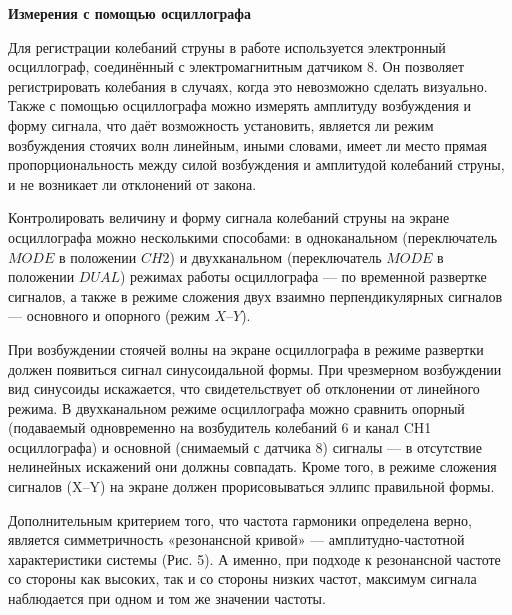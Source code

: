 \documentclass[a4paper,12pt]{article} %
\begin{document}
{\bf Измерения с помощью осциллографа}

Для регистрации колебаний струны в работе используется электронный
осциллограф, соединённый с электромагнитным датчиком 8. Он позволяет
регистрировать колебания в случаях, когда это невозможно сделать визуально. Также с помощью осциллографа можно измерять амплитуду возбуждения и форму сигнала, что даёт возможность установить, является ли режим
возбуждения стоячих волн линейным, иными словами, имеет ли место прямая пропорциональность между силой возбуждения и амплитудой колебаний
струны, и не возникает ли отклонений от закона. 

Контролировать величину и форму сигнала колебаний струны на экране
осциллографа можно несколькими способами: в одноканальном (переключатель $MODE$ в положении $CH2$) и двухканальном (переключатель $MODE$ в положении $DUAL$) режимах работы осциллографа — по временной развертке
сигналов, а также в режиме сложения двух взаимно перпендикулярных сигналов — основного и опорного (режим $X$--$Y$).

При возбуждении стоячей волны на экране осциллографа в режиме развертки должен появиться сигнал синусоидальной формы. При чрезмерном
возбуждении вид синусоиды искажается, что свидетельствует об отклонении
от линейного режима. В двухканальном режиме осциллографа можно сравнить опорный (подаваемый одновременно на возбудитель колебаний 6 и канал CH1 осциллографа) и основной (снимаемый с датчика 8) сигналы — в
отсутствие нелинейных искажений они должны совпадать. Кроме того, в режиме сложения сигналов (X–Y) на экране должен прорисовываться эллипс
правильной формы.

Дополнительным критерием того, что частота гармоники определена
верно, является симметричность «резонансной кривой» — амплитудно-частотной характеристики системы (Рис. 5). А именно, при подходе к резонансной частоте со стороны как высоких, так и со стороны низких частот, максимум сигнала наблюдается при одном и том же значении частоты.
\end{document}
